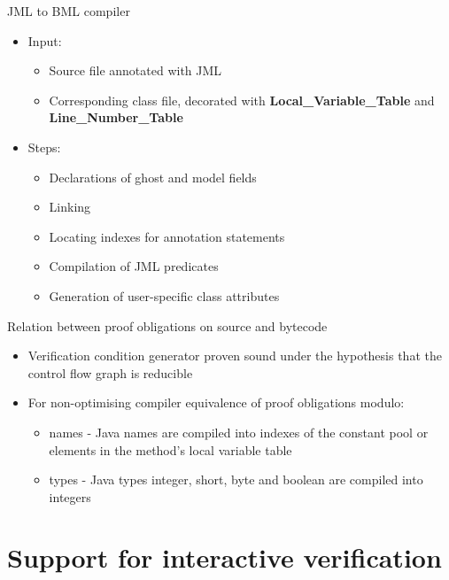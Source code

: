 \documentclass[final,nocolorBG,a4,mobius,nototal,pdf,slideColor]{prosper}
\begin{document}
\begin{slide}{JML to BML compiler}
 \begin{itemize}
 \item Input:
 \begin{itemize}
  \item Source file annotated with JML 
  \item Corresponding class file, decorated with
\textbf{Local\_Variable\_Table} and \textbf{Line\_Number\_Table} 
 \end{itemize}
 \item Steps:
 \begin{itemize}
  \item Declarations of ghost and model fields
  \item Linking 
  \item Locating indexes for annotation statements
  \item Compilation of JML predicates
  \item Generation of user-specific class attributes
 \end{itemize}
 
\end{itemize}
\end{slide}


 
\begin{slide}{Relation between proof obligations on source and bytecode}
\begin{itemize}
 \item Verification condition generator proven sound under the hypothesis that the control flow graph is reducible 

\item For non-optimising compiler equivalence of proof obligations modulo:
 \begin{itemize} \item names - Java names are compiled into indexes of
 the constant pool or elements in the method's local variable table
 
 \item types - Java types integer, short, byte and boolean are
 compiled into integers
 
 \end{itemize}
\end{itemize}
\end{slide}

\part{Support for interactive verification}
\end{document}
